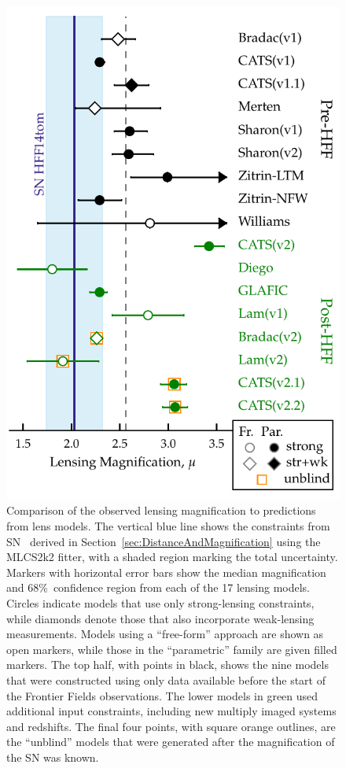 \begin{figure}
\begin{center}
\includegraphics[width=\columnwidth]{snTomas_magnifications}
\caption{ 
Comparison of the observed lensing magnification to predictions from
lens models. The vertical blue line shows the constraints from
SN \tomas\ derived in Section~\ref{sec:DistanceAndMagnification} using
the MLCS2k2 fitter, with a shaded region marking the total
uncertainty. Markers with horizontal error bars show the median
magnification and 68\%\ confidence region from each of the 17 lensing
models.  Circles indicate models that use only strong-lensing
constraints, while diamonds denote those that also incorporate
weak-lensing measurements.  Models using a ``free-form''
approach are shown as open markers, while those in the ``parametric''
family are given filled markers.  The top half, with points in black, shows the nine
models that were constructed using only data available before the
start of the Frontier Fields observations. 
The lower  models in
green used additional input constraints, including new multiply imaged
systems and redshifts.  The final four points, with square orange
outlines, are the ``unblind'' models that were generated after the
magnification of the SN was known.  
\label{fig:LensingTest} }
\end{center}
\end{figure}


